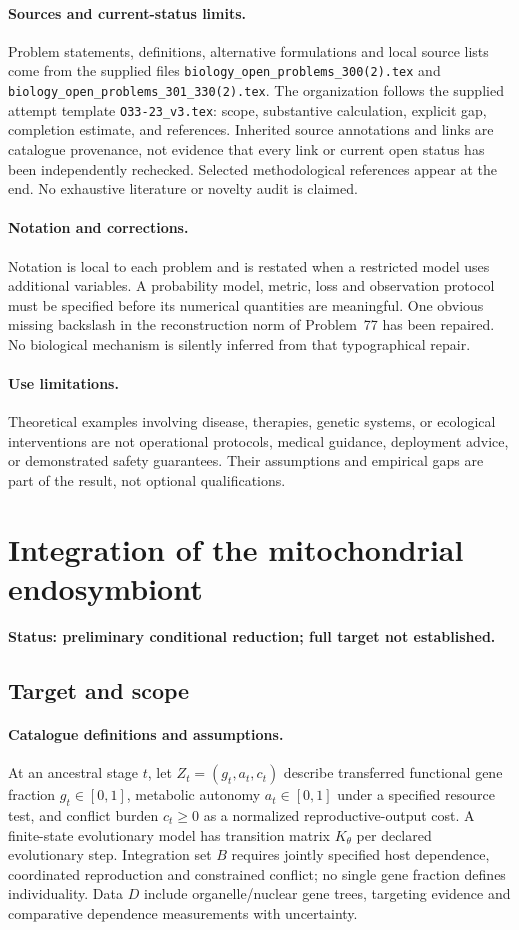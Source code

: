 \documentclass[11pt]{article}
\begin{document}
\paragraph{Sources and current-status limits.}
Problem statements, definitions, alternative formulations and local source lists
come from the supplied files
\texttt{biology\_open\_problems\_300(2).tex} and
\texttt{biology\_open\_problems\_301\_330(2).tex}.
The organization follows the supplied attempt template
\texttt{O33-23\_v3.tex}: scope, substantive calculation, explicit gap,
completion estimate, and references. Inherited source annotations and links are
catalogue provenance, not evidence that every link or current open status has
been independently rechecked. Selected methodological references appear at the
end. No exhaustive literature or novelty audit is claimed.

\paragraph{Notation and corrections.}
Notation is local to each problem and is restated when a restricted model uses
additional variables. A probability model, metric, loss and observation protocol
must be specified before its numerical quantities are meaningful. One obvious
missing backslash in the reconstruction norm of Problem~77 has been repaired.
No biological mechanism is silently inferred from that typographical repair.

\paragraph{Use limitations.}
Theoretical examples involving disease, therapies, genetic systems, or ecological
interventions are not operational protocols, medical guidance, deployment advice,
or demonstrated safety guarantees. Their assumptions and empirical gaps are part
of the result, not optional qualifications.


\section*{Integration of the mitochondrial endosymbiont}
\label{prob:306}
\noindent\textbf{Status: preliminary conditional reduction; full target not established.}
\subsection{Target and scope}
\paragraph{Catalogue definitions and assumptions.}
At an ancestral stage $t$, let $Z_t=(g_t,a_t,c_t)$ describe transferred functional gene fraction $g_t\in[0,1]$, metabolic autonomy $a_t\in[0,1]$ under a specified resource test, and conflict burden $c_t\geq0$ as a normalized reproductive-output cost. A finite-state evolutionary model has transition matrix $K_\theta$ per declared evolutionary step. Integration set $B$ requires jointly specified host dependence, coordinated reproduction and constrained conflict; no single gene fraction defines individuality. Data $D$ include organelle/nuclear gene trees, targeting evidence and comparative dependence measurements with uncertainty.
\end{document}
